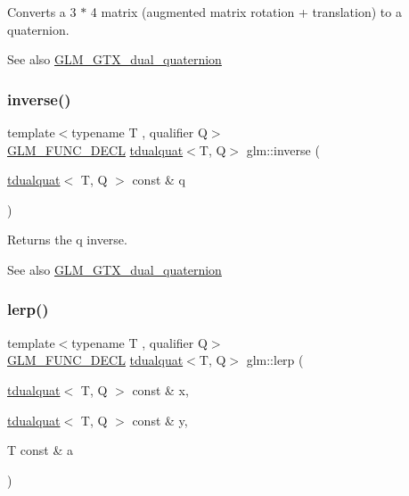 Converts a 3 $\ast$ 4 matrix (augmented matrix rotation + translation) to a quaternion.

\begin{DoxySeeAlso}{See also}
\hyperlink{group__gtx__dual__quaternion}{G\+L\+M\+\_\+\+G\+T\+X\+\_\+dual\+\_\+quaternion} 
\end{DoxySeeAlso}
\mbox{\label{group__gtx__dual__quaternion_ga070f521a953f6461af4ab4cf8ccbf27e}} 
\subsubsection{\texorpdfstring{inverse()}{inverse()}}
{\footnotesize\ttfamily template$<$typename T , qualifier Q$>$ \\
\hyperlink{setup_8hpp_ab2d052de21a70539923e9bcbf6e83a51}{G\+L\+M\+\_\+\+F\+U\+N\+C\+\_\+\+D\+E\+CL} \hyperlink{structglm_1_1tdualquat}{tdualquat}$<$T, Q$>$ glm\+::inverse (\begin{DoxyParamCaption}\item[{\hyperlink{structglm_1_1tdualquat}{tdualquat}$<$ T, Q $>$ const \&}]{q }\end{DoxyParamCaption})}

Returns the q inverse.

\begin{DoxySeeAlso}{See also}
\hyperlink{group__gtx__dual__quaternion}{G\+L\+M\+\_\+\+G\+T\+X\+\_\+dual\+\_\+quaternion} 
\end{DoxySeeAlso}
\mbox{\label{group__gtx__dual__quaternion_gace8380112d16d33f520839cb35a4d173}} 
\subsubsection{\texorpdfstring{lerp()}{lerp()}}
{\footnotesize\ttfamily template$<$typename T , qualifier Q$>$ \\
\hyperlink{setup_8hpp_ab2d052de21a70539923e9bcbf6e83a51}{G\+L\+M\+\_\+\+F\+U\+N\+C\+\_\+\+D\+E\+CL} \hyperlink{structglm_1_1tdualquat}{tdualquat}$<$T, Q$>$ glm\+::lerp (\begin{DoxyParamCaption}\item[{\hyperlink{structglm_1_1tdualquat}{tdualquat}$<$ T, Q $>$ const \&}]{x,  }\item[{\hyperlink{structglm_1_1tdualquat}{tdualquat}$<$ T, Q $>$ const \&}]{y,  }\item[{T const \&}]{a }\end{DoxyParamCaption})}

